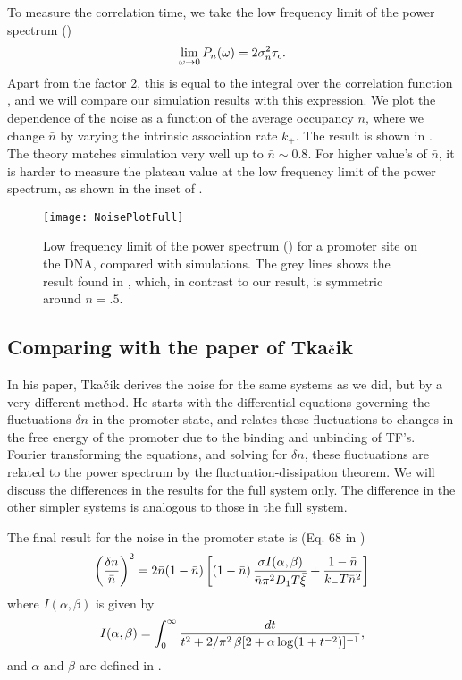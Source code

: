 To measure the correlation time, we take the low frequency limit of the power spectrum ()
\begin{equation}
 \lim_{\omega\to0} P_n(\omega) = 2 \sigma_n^2 \tau_c.
 \elabel{PowPro}
\end{equation}
Apart from the factor 2, this is equal to the integral over the correlation function , and we will compare our simulation results with this expression. We plot the dependence of the noise as a function of the average occupancy $\bar{n}$, where we change $\bar{n}$ by varying the intrinsic association rate $k_+$. The result is shown in . The theory matches simulation very well up to $\bar{n}\sim0.8$. For higher value's of $\bar{n}$, it is harder to measure the plateau value at the low frequency limit of the power spectrum, as shown in the inset of . 

\begin{figure}
\centering
\texttt{[image: NoisePlotFull]}
\caption{ Low frequency limit of the power spectrum () for a promoter site on the DNA, compared with simulations. The grey lines shows the result found in \cite{Tkacik2009}, which, in contrast to our result, is symmetric around $n=.5$.}
\end{figure}



\subsection{Comparing with the paper of Tka$\check{\bf c}$ik}
In his paper, Tka$\check{\rm c}$ik derives the noise for the same systems as we did, but by a very different method. He starts with the differential equations governing the fluctuations $\delta n$ in the promoter state, and relates these fluctuations to changes in the free energy of the promoter due to the binding and unbinding of TF's. Fourier transforming the equations, and solving for $\delta n$, these fluctuations are related to the power spectrum by the fluctuation-dissipation theorem. We will discuss the differences in the results for the full system only. The difference in the other simpler systems is analogous to those in the full system. 

The final result for the noise in the promoter state is (Eq. 68 in \cite{Tkacik2009}) 
\begin{equation}
 \elabel{NoiseProTka}
 \left( \frac{\delta n}{\bar{n}} \right)^2 = 2 \bar{n}(1-\bar{n})\left[ (1 -\bar{n}) \, \frac{\sigma I(\alpha,\beta)}{\bar{n} \pi^2 D_1 T \bar{\xi}} + \frac{1-\bar{n}}{k_- T \bar{n}^2} \right]
\end{equation}
where $I(\alpha,\beta)$ is given by
\begin{equation}
 \elabel{IntProTka}
 I(\alpha,\beta) = \int_0^{\infty} \frac{dt}{t^2 + 2/\pi^{2} \, \beta[2 + \alpha \, {\rm log}(1 + t^{-2})]^{-1}},
\end{equation}
and $\alpha$ and $\beta$ are defined in . 

